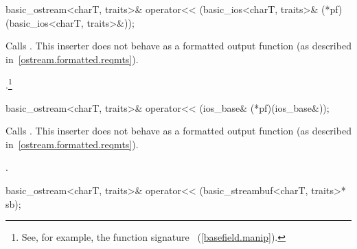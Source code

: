 %
%
\begin{itemdecl}
basic_ostream<charT, traits>& operator<<
    (basic_ios<charT, traits>& (*pf)(basic_ios<charT, traits>&));
\end{itemdecl}

\begin{itemdescr}
\pnum
\effects
Calls
.
This inserter does not
behave as a formatted output function (as described in~\ref{ostream.formatted.reqmts}).

\pnum
\returns
{}.\footnote{See, for example, the function signature
%
~(\ref{basefield.manip}).}
\end{itemdescr}

%
%
\begin{itemdecl}
basic_ostream<charT, traits>& operator<<
    (ios_base& (*pf)(ios_base&));
\end{itemdecl}

\begin{itemdescr}
\pnum
\effects
Calls
.
This inserter does not
behave as a formatted output function (as described in~\ref{ostream.formatted.reqmts}).

\pnum
\returns
{}.
\end{itemdescr}

%
%
\begin{itemdecl}
basic_ostream<charT, traits>& operator<<
    (basic_streambuf<charT, traits>* sb);
\end{itemdecl}

